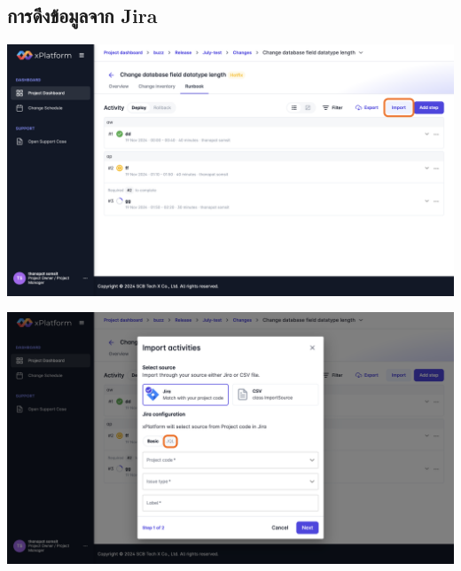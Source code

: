 \subsection{การดึงข้อมูลจาก Jira}
\begin{center}
    \includegraphics[width=\linewidth]{resources/pages/change-runbook/import-jira/22.png}

    \vspace{1in}

    \includegraphics[width=\linewidth]{resources/pages/change-runbook/import-jira/23.png}
\end{center}
